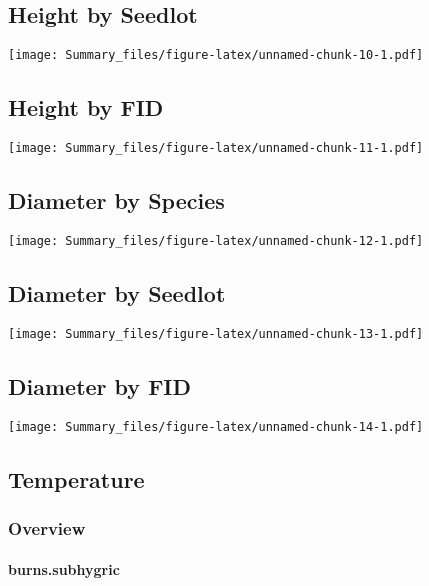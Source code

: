 \documentclass[
]{article}
\begin{document}
\hypertarget{height-by-seedlot}{%
\subsection{Height by Seedlot}\label{height-by-seedlot}}

\texttt{[image: Summary\_files/figure-latex/unnamed-chunk-10-1.pdf]}

\hypertarget{height-by-fid}{%
\subsection{Height by FID}\label{height-by-fid}}

\texttt{[image: Summary\_files/figure-latex/unnamed-chunk-11-1.pdf]}

\hypertarget{diameter-by-species}{%
\subsection{Diameter by Species}\label{diameter-by-species}}

\texttt{[image: Summary\_files/figure-latex/unnamed-chunk-12-1.pdf]}

\hypertarget{diameter-by-seedlot}{%
\subsection{Diameter by Seedlot}\label{diameter-by-seedlot}}

\texttt{[image: Summary\_files/figure-latex/unnamed-chunk-13-1.pdf]}

\hypertarget{diameter-by-fid}{%
\subsection{Diameter by FID}\label{diameter-by-fid}}

\texttt{[image: Summary\_files/figure-latex/unnamed-chunk-14-1.pdf]}

\hypertarget{temperature}{%
\subsection{Temperature}\label{temperature}}

\hypertarget{overview}{%
\subsubsection{Overview}\label{overview}}

\hypertarget{burns.subhygric}{%
\paragraph{burns.subhygric}\label{burns.subhygric}}
\end{document}
